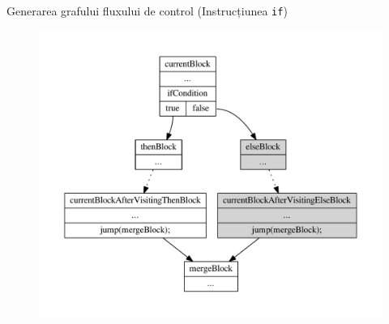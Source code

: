 \documentclass{beamer}
\def\code#1{\texttt{#1}}
\begin{document}
\begin{frame}{Generarea grafului fluxului de control (Instrucțiunea \code{if})}
    \begin{figure}[htb]
        \centering
        \includegraphics[width=.7\textwidth]{../../../theses/diploma/src/graph/if.pdf}
    \end{figure}
\end{frame}
\end{document}
